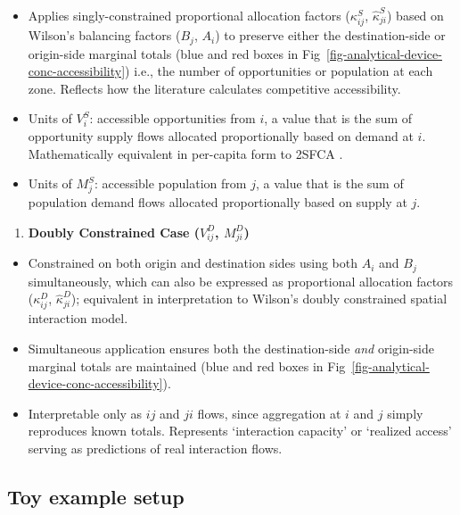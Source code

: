 \documentclass[
  10pt,
  letterpaper,
]{article}
\providecommand{\tightlist}{%
  \setlength{\itemsep}{0pt}\setlength{\parskip}{0pt}}\usepackage{longtable,booktabs,array}
\begin{document}
\begin{itemize}
\tightlist
\item
  Applies singly-constrained proportional allocation factors
  (\(\kappa_{ij}^S\), \(\hat \kappa_{ji}^S\)) based on Wilson's
  balancing factors (\(B_j\), \(A_i\)) to preserve either the
  destination-side or origin-side marginal totals (blue and red boxes in
  Fig~\ref{fig-analytical-device-conc-accessibility}) i.e., the number
  of opportunities or population at each zone. Reflects how the
  literature calculates competitive accessibility.
\item
  Units of \(V_i^S\): accessible opportunities from \(i\), a value that
  is the sum of opportunity supply flows allocated proportionally based
  on demand at \(i\). Mathematically equivalent in per-capita form to
  2SFCA \citep{luo2003}.
\item
  Units of \(M_j^S\): accessible population from \(j\), a value that is
  the sum of population demand flows allocated proportionally based on
  supply at \(j\).
\end{itemize}

\begin{enumerate}
\def\labelenumi{\arabic{enumi}.}
\setcounter{enumi}{3}
\tightlist
\item
  \textbf{Doubly Constrained Case (\(V_{ij}^D\), \(M_{ji}^D\))}
\end{enumerate}

\begin{itemize}
\tightlist
\item
  Constrained on both origin and destination sides using both \(A_i\)
  and \(B_j\) simultaneously, which can also be expressed as
  proportional allocation factors (\(\kappa_{ij}^D\),
  \(\hat \kappa_{ji}^D\)); equivalent in interpretation to Wilson's
  \citep{wilson1971} doubly constrained spatial interaction model.
\item
  Simultaneous application ensures both the destination-side \emph{and}
  origin-side marginal totals are maintained (blue and red boxes in
  Fig~\ref{fig-analytical-device-conc-accessibility}).
\item
  Interpretable only as \(ij\) and \(ji\) flows, since aggregation at
  \(i\) and \(j\) simply reproduces known totals. Represents
  `interaction capacity' or `realized access' serving as predictions of
  real interaction flows.
\end{itemize}

\subsection{Toy example setup}\label{toy-example-setup}
\end{document}
